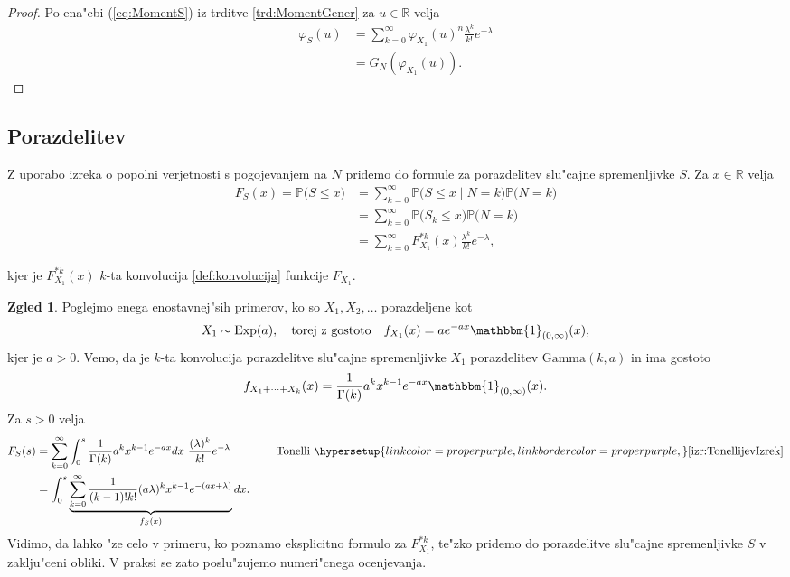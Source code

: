 \documentclass[12pt, a4paper, reqno]{amsart}
\theoremstyle{definition}
\newtheorem{zgled}[definicija]{Zgled}
\theoremstyle{plain}
\newcommand{\R}{\mathbb{R}}
\newcommand{\Prob}{\mathbb{P}}
\newcommand{\1}{\mathds{1}}
\newcommand*{\refPriloga}[1]{%
  \begingroup
    \hypersetup{
      linkcolor=properpurple,
      linkbordercolor=properpurple,
    }%
    \ref{#1}%
  \endgroup
}
\begin{document}
    \begin{proof}
        Po ena"cbi (\ref{eq:MomentS}) iz trditve \ref{trd:MomentGener} za $u\in\R$ velja
        \begin{align*}
            \varphi_{S}(u) &= \sum_{k=0}^{\infty}
            \varphi_{X_1}(u)^n\frac{\lambda^k}{k!}e^{-\lambda} \\
            &= G_{N}\left(\varphi_{X_1}(u)\right).
        \end{align*}
    \end{proof}

    \subsection{Porazdelitev}
    Z uporabo izreka o popolni verjetnosti s pogojevanjem na $N$ pridemo do formule za 
    porazdelitev slu"cajne spremenljivke $S$. Za $x \in \R$ velja 
    \begin{align*}
        F_{S}(x) = \Prob\bigl(S \leq x\bigr) 
        &= \sum_{k=0}^\infty \Prob\bigl(S \leq x \mid N = k\bigr)\Prob\bigl(N = k\bigr) \\
        &= \sum_{k=0}^\infty \Prob\bigl(S_k \leq x\bigr)\Prob\bigl(N = k\bigr) \\
        &= \sum_{k=0}^\infty F_{X_1}^{*k}(x) \frac{\lambda^k}{k!} e^{-\lambda},
    \end{align*}

    \noindent
    kjer je $F_{X_1}^{*k}(x)$  $k$-ta konvolucija \refPriloga{def:konvolucija} funkcije $F_{X_1}$.
    
    \begin{zgled}
        Poglejmo enega enostavnej"sih primerov, ko so $X_1, X_2, \dots$ porazdeljene kot
        \begin{equation*}
            X_1\sim\text{Exp}(a),\quad \text{torej z gostoto} \quad  f_{X_1}(x) = a e^{-a x}\mathbbm{1}_{(0, \infty)}(x),
        \end{equation*}
        kjer je $a>0$. Vemo, da je $k$-ta 
        konvolucija porazdelitve slu"cajne spremenljivke $X_1$ porazdelitev
         $\text{Gamma}(k, a)$ in ima gostoto
        \begin{equation*}
            f_{X_1 + \cdots + X_k}(x) = \frac{1}{\Gamma(k)}a^kx^{k-1}e^{-a x}\mathbbm{1}_{(0, \infty)}(x).
        \end{equation*}
        Za $s>0$ velja
        \begin{align*}
            F_{S}(s) 
            &= \sum_{k=0}^\infty \int_0^s\frac{1}{\Gamma(k)}a^kx^{k-1}e^{-ax}dx \ \frac{(\lambda )^k}{k!}e^{-\lambda }
            \qquad \qquad \text{Tonelli} \ \refPriloga{izr:TonellijevIzrek} \\
            &= \int_0^s\underbrace{\sum_{k=0}^\infty \frac{1}{(k-1)!k!}(a\lambda)^kx^{k-1}e^{-(ax + \lambda)}}_{f_S(x)}dx.
        \end{align*}
        Vidimo, da lahko "ze celo v primeru, ko poznamo eksplicitno formulo za $F^{*k}_{X_1}$, te"zko pridemo do 
        porazdelitve slu"cajne spremenljivke $S$ v zaklju"ceni obliki. V praksi se zato poslu"zujemo numeri"cnega 
        ocenjevanja.
        \label{zgd:sestavljenaPoissonovaPorazdelitevGamma}
    \end{zgled}
\end{document}
